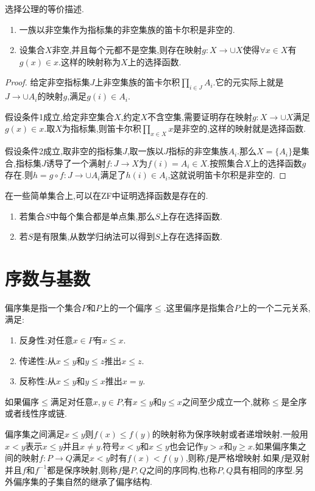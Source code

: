 选择公理的等价描述.
\begin{enumerate}
	\item 一族以非空集作为指标集的非空集族的笛卡尔积是非空的.
	\item 设集合$X$非空,并且每个元都不是空集,则存在映射$g:X\to\cup X$使得$\forall x\in X$有$g(x)\in x$.这样的映射称为$X$上的选择函数.
\end{enumerate}
\begin{proof}
	
给定非空指标集$J$上非空集族的笛卡尔积$\prod_{i\in J}A_i$.它的元实际上就是$J\to\cup A_i$的映射$g$,满足$g(i)\in A_i$.

假设条件1成立,给定非空集合$X$,约定$X$不含空集,需要证明存在映射$g:X\to\cup X$满足$g(x)\in x$.取$X$为指标集,则笛卡尔积$\prod_{x\in X}x$是非空的,这样的映射就是选择函数.

假设条件2成立,取非空的指标集$J$,取一族以$J$指标的非空集族$A_i$.那么$X=\{A_i\}$是集合,指标集$J$诱导了一个满射$f:J\to X$为$f(i)=A_i\in X$.按照集合$X$上的选择函数$g$存在.则$h=g\circ f:J\to\cup A_i$满足了$h(i)\in A_i$,这就说明笛卡尔积是非空的.
\end{proof}

在一些简单集合上,可以在ZF中证明选择函数是存在的.
\begin{enumerate}
	\item 若集合$S$中每个集合都是单点集,那么$S$上存在选择函数.
	\item 若$S$是有限集,从数学归纳法可以得到$S$上存在选择函数.
\end{enumerate}
\newpage
\section{序数与基数}

偏序集是指一个集合$P$和$P$上的一个偏序$\le$.这里偏序是指集合$P$上的一个二元关系,满足:
\begin{enumerate}
	\item 反身性:对任意$x\in P$有$x\le x$.
	\item 传递性:从$x\le y$和$y\le z$推出$x\le z$.
	\item 反称性:从$x\le y$和$y\le x$推出$x=y$.
\end{enumerate}

如果偏序$\le$满足对任意$x,y\in P$,有$x\le y$和$y\le x$之间至少成立一个,就称$\le$是全序或者线性序或链.

偏序集之间满足$x\le y$则$f(x)\le f(y)$的映射称为保序映射或者递增映射.一般用$x<y$表示$x\le y$并且$x\not=y$.符号$x<y$和$x\le y$也会记作$y>x$和$y\ge x$.如果偏序集之间的映射$f:P\to Q$满足$x<y$时有$f(x)<f(y)$,则称$f$是严格增映射.如果$f$是双射并且$f$和$f^{-1}$都是保序映射,则称$f$是$P,Q$之间的序同构,也称$P,Q$具有相同的序型.另外偏序集的子集自然的继承了偏序结构.

